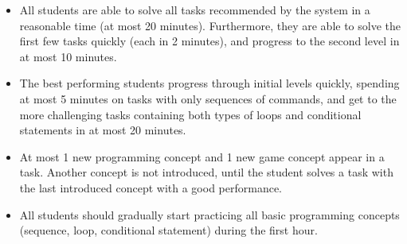 \begin{itemize}
\item All students are able to solve all tasks recommended by the system
  in a reasonable time (at most 20 minutes).
  Furthermore, they are able to solve the first few tasks quickly
  (each in 2 minutes), and progress to the second level in at most 10 minutes.
\item The best performing students %
progress through initial levels quickly, spending at most 5 minutes
on tasks with only sequences of commands, and get to the more
challenging tasks containing both types of loops and conditional statements
in at most 20 minutes.  %
\item At most 1 new programming concept and 1 new game concept appear
  in a task. Another concept is not introduced, until the student
  solves a task with the last introduced concept with a good
  performance. %
\item All students should gradually start practicing all basic programming concepts
  (sequence, loop, conditional statement) during the first hour. %
\end{itemize}

